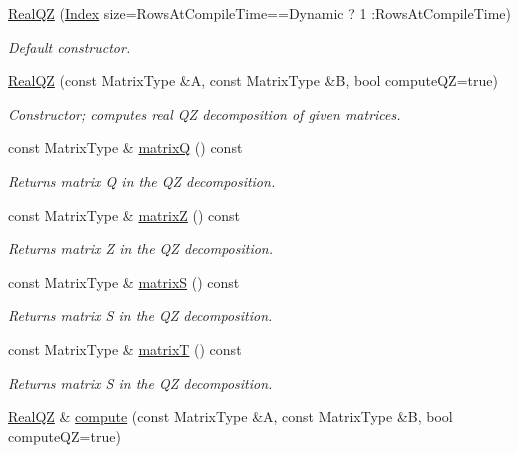 \begin{DoxyCompactItemize}
\item 
\mbox{\hyperlink{class_eigen_1_1_real_q_z_ad8fb9235870a8361a2fdd8dcc2e80d01}{Real\+QZ}} (\mbox{\hyperlink{class_eigen_1_1_real_q_z_a6201e534e901b5f4e66f72c176b534a3}{Index}} size=Rows\+At\+Compile\+Time==Dynamic ? 1 \+:Rows\+At\+Compile\+Time)
\begin{DoxyCompactList}\small\item\em Default constructor. \end{DoxyCompactList}\item 
\mbox{\hyperlink{class_eigen_1_1_real_q_z_ac6e41c839f8dae31c9a3906ea7540119}{Real\+QZ}} (const Matrix\+Type \&A, const Matrix\+Type \&B, bool compute\+QZ=true)
\begin{DoxyCompactList}\small\item\em Constructor; computes real QZ decomposition of given matrices. \end{DoxyCompactList}\item 
const Matrix\+Type \& \mbox{\hyperlink{class_eigen_1_1_real_q_z_a212bc2f69ea4eff830fde70e209e40fb}{matrixQ}} () const
\begin{DoxyCompactList}\small\item\em Returns matrix Q in the QZ decomposition. \end{DoxyCompactList}\item 
const Matrix\+Type \& \mbox{\hyperlink{class_eigen_1_1_real_q_z_a19a116383f11423179b4d8f316da6f67}{matrixZ}} () const
\begin{DoxyCompactList}\small\item\em Returns matrix Z in the QZ decomposition. \end{DoxyCompactList}\item 
const Matrix\+Type \& \mbox{\hyperlink{class_eigen_1_1_real_q_z_ad24d7bf534afb55adaef00f00846adaf}{matrixS}} () const
\begin{DoxyCompactList}\small\item\em Returns matrix S in the QZ decomposition. \end{DoxyCompactList}\item 
const Matrix\+Type \& \mbox{\hyperlink{class_eigen_1_1_real_q_z_a8dc963d8ea2a17df9d8d718e9e34d06f}{matrixT}} () const
\begin{DoxyCompactList}\small\item\em Returns matrix S in the QZ decomposition. \end{DoxyCompactList}\item 
\mbox{\hyperlink{class_eigen_1_1_real_q_z}{Real\+QZ}} \& \mbox{\hyperlink{class_eigen_1_1_real_q_z_a2b6847964d9f1903193cc3e67c196849}{compute}} (const Matrix\+Type \&A, const Matrix\+Type \&B, bool compute\+QZ=true)

\end{DoxyCompactItemize}
